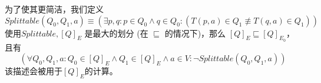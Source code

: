 \newpage

\begin{definition}[函数 $Splittable$]
    为了使其更简洁，我们定义
    \[  Splittable(Q_0,Q_1,a) \equiv (\exists p,q:p\in Q_0 \land q\in Q_0 : (T(p,a) \in Q_1 \not\equiv T(q,a) \in Q_1)) \]
    使用$Splittable,[Q]_E$ 是最大的划分 (在 $\sqsubseteq$ 的情况下)，那么 $[Q]_E \sqsubseteq [Q]_{E_0}$，且有
    $$ (\forall Q_0,Q_1,a:Q_0 \in [Q]_E \land Q_1 \in [Q]_E \land a \in V : \neg Splittable(Q_0,Q_1,a)) $$
    该描述会被用于$[Q]_E$的计算。
\end{definition}
